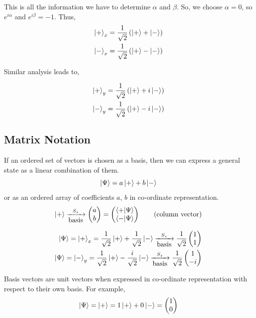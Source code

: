 \documentclass[english, 11pt]{article}
\begin{document}
          This is all the information we have to determine $\alpha$ and $\beta$. So, we choose $\alpha = 0$, so $e^{i\alpha}$ and $e^{i\beta} =-1$. Thus,
          \begin{align*}
            \left|+\right\rangle_x & = \frac{1}{\sqrt{2}} \left( \left|+\right\rangle + \left|-\right\rangle \right) \\
            \left|-\right\rangle_x & = \frac{1}{\sqrt{2}} \left( \left|+\right\rangle - \left|-\right\rangle \right) \\
          \end{align*}

          Similar analysis leads to,

          \begin{align*}
            \left|+\right\rangle_y & = \frac{1}{\sqrt{2}} \left( \left|+\right\rangle + i\left|-\right\rangle \right) \\
            \left|-\right\rangle_y & = \frac{1}{\sqrt{2}} \left( \left|+\right\rangle - i\left|-\right\rangle \right) \\
          \end{align*}

          \subsection{Matrix Notation}

          If an ordered set of vectors is chosen as a basis, then we can express a general state as a linear combination of them.
          \[ \left|\Psi\right\rangle = a\left|+\right\rangle + b\left|-\right\rangle \]
          or as an ordered array of coefficients $a$, $b$ in co-ordinate representation.
          \begin{align*}
            \ket{+} \xrightarrow[\mbox{basis}]{S_z} \mtx{a \\ b} = \mtx{\braket{+}{\Psi} \\ \braket{-}{\Psi}} \ \ \ \ \ \ \mbox{(column vector)}
          \end{align*}

          \begin{align*}
            \left|\Psi\right\rangle = \left|+\right\rangle_x = \frac{1}{\sqrt{2}} \left|+\right\rangle + \frac{1}{\sqrt{2}}\left|-\right\rangle \xrightarrow[\mbox{basis}]{S_z} \frac{1}{\sqrt{2}} \left(\begin{matrix}1 \\ 1\end{matrix}\right) \\
            \left|\Psi\right\rangle = \left|-\right\rangle_y = \frac{1}{\sqrt{2}} \left|+\right\rangle - \frac{i}{\sqrt{2}}\left|-\right\rangle \xrightarrow[\mbox{basis}]{S_z} \frac{1}{\sqrt{2}} \left(\begin{matrix}1 \\ -i\end{matrix}\right)
          \end{align*}

          \begin{note}
            Basis vectors are unit vectors when expressed in co-ordinate representation with respect to their own basis. For example,
            \[ \left|\Psi\right\rangle = \left|+\right\rangle = 1\left|+\right\rangle + 0\left|-\right\rangle = \left(\begin{matrix}1\\0\end{matrix}\right) \]
          \end{note}
\end{document}
